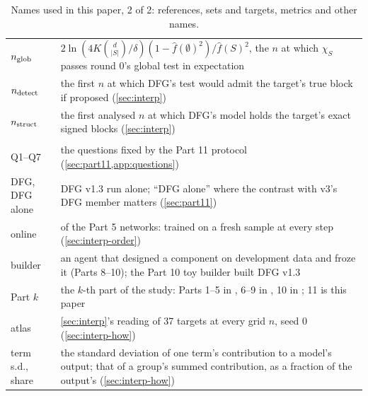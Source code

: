\begin{table}[p]
\begin{tabularx}{\linewidth}{>{\raggedright\arraybackslash}p{3.45cm}>{\raggedright\arraybackslash}X}
$n_{\rm glob}$ & $2\ln(4K\binom d{|S|}/\delta)(1-\hat f(\emptyset)^2)/\hat f(S)^2$, the $n$ at which $\chi_S$ passes round 0's global test in expectation\\
$n_{\rm detect}$ & the first $n$ at which DFG's test would admit the target's true block if proposed (\cref{sec:interp})\\
$n_{\rm struct}$ & the first analysed $n$ at which DFG's model holds the target's exact signed blocks (\cref{sec:interp})\\
\addlinespace
\multicolumn{2}{l}{\emph{Other}}\\
Q1--Q7 & the questions fixed by the Part 11 protocol (\cref{sec:part11,app:questions})\\
DFG, DFG alone & DFG v1.3 run alone; ``DFG alone'' where the contrast with v3's DFG member matters (\cref{sec:part11})\\
online & of the Part 5 networks: trained on a fresh sample at every step (\cref{sec:interp-order})\\
builder & an agent that designed a component on development data and froze it (Parts 8--10); the Part 10 toy builder built DFG v1.3\\
Part $k$ & the $k$-th part of the study: Parts 1--5 in \cite{gdcircuit2026}, 6--9 in \cite{discretelearners2026}, 10 in \cite{portfoliolearner2026}; 11 is this paper\\
atlas & \cref{sec:interp}'s reading of 37 targets at every grid $n$, seed 0 (\cref{sec:interp-how})\\
term s.d., share & the standard deviation of one term's contribution to a model's output; that of a group's summed contribution, as a fraction of the output's (\cref{sec:interp-how})\\
\bottomrule
\end{tabularx}
\caption{Names used in this paper, 2 of 2: references, sets and targets, metrics and other names.}
\label{tab:names-b}
\end{table}

\clearpage
